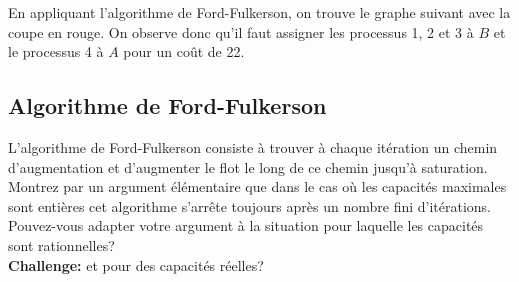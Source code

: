 \begin{solution}
  En appliquant l'algorithme de Ford-Fulkerson, on trouve le graphe suivant
  avec la coupe en rouge.
  On observe donc qu'il faut assigner les processus 1, 2 et 3 à $B$
  et le processus 4 à $A$ pour un coût de 22.
  \begin{center}
  \end{center}
\end{solution}

\subsection{Algorithme de Ford-Fulkerson}
L'algorithme de Ford-Fulkerson consiste à trouver à chaque itération un chemin d'augmentation et d'augmenter le flot le long de ce chemin jusqu'à saturation. Montrez par un argument élémentaire que dans le cas où les capacités maximales sont entières cet algorithme s'arrête toujours après un nombre fini d'itérations. Pouvez-vous adapter votre argument à la situation pour laquelle les capacités sont rationnelles? \\
\textbf{Challenge:} et pour des capacités réelles?

